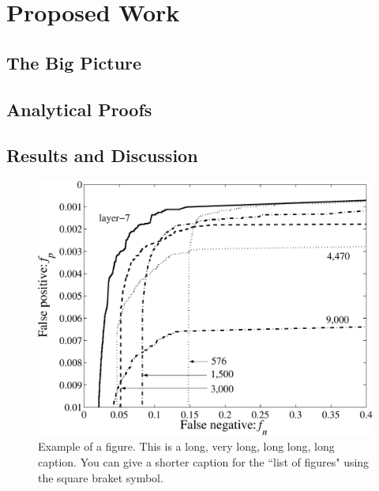 \chapter{Proposed Work}
\label{chap:proposed.work}
\section{The Big Picture}
\section{Analytical Proofs}


\section{Results and Discussion}

\begin{figure}[p]
	\centering
	\includegraphics[width=\linewidth]{./figs/roc_TREC}
	\caption[Short version of the caption.]{Example of a figure. This is a long, very long, long long, long caption.  You can give a shorter caption for the ``list of figures" using the square braket symbol.}
\end{figure}



